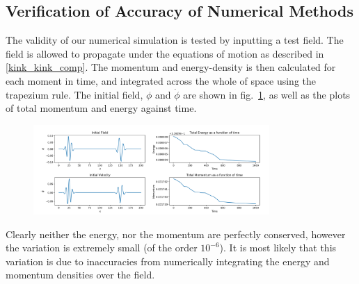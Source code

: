 \documentclass[11pt, oneside,titlepage]{article}  	%
\numberwithin{equation}{section}
\begin{document}
 \subsection{Verification of Accuracy of Numerical Methods}\label{tests}
 The validity of our numerical simulation is tested by inputting a test field. The field is allowed to propagate under the equations of motion as described in \textsection \ref{kink_kink_comp}. The momentum and energy-density is then calculated for each moment in time, and integrated across the whole of space using the trapezium rule. The initial field, $\phi$ and $\dot{\phi}$ are shown in fig.~\ref{test_field}, as well as the plots of total momentum and energy against time.\par
\begin{figure}
\centering
\includegraphics[width=0.8\textwidth]{test_field_energy.png}
 \label{test_field}
\end{figure}
Clearly neither the energy, nor the momentum are perfectly conserved, however the variation is extremely small (of the order $10^{-6}$). It is most likely that this variation is due to inaccuracies from numerically integrating the energy and momentum densities over the field. 


\end{document}
